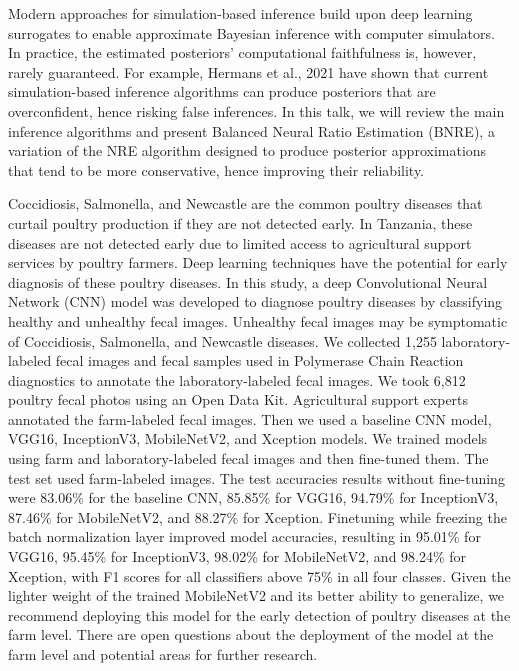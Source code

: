 \license

Modern approaches for simulation-based inference build upon deep learning surrogates to enable approximate Bayesian inference with computer simulators. In practice, the estimated posteriors' computational faithfulness is, however, rarely guaranteed. For example, Hermans et al., 2021 have shown that current simulation-based inference algorithms can produce posteriors that are overconfident, hence risking false inferences. In this talk, we will review the main inference algorithms and present Balanced Neural Ratio Estimation (BNRE), a variation of the NRE algorithm designed to produce posterior approximations that tend to be more conservative, hence improving their reliability.

\license

Coccidiosis, Salmonella, and Newcastle are the common poultry diseases that curtail poultry production if they are not detected early. In Tanzania, these diseases are not detected early due to limited access to agricultural support services by poultry farmers. Deep learning techniques have the potential for early diagnosis of these poultry diseases. In this study, a deep Convolutional Neural Network (CNN) model was developed to diagnose poultry diseases by classifying healthy and unhealthy fecal images. Unhealthy fecal images may be symptomatic of Coccidiosis, Salmonella, and Newcastle diseases. We collected 1,255 laboratory-labeled fecal images and fecal samples used in Polymerase Chain Reaction diagnostics to annotate the laboratory-labeled fecal images. We took 6,812 poultry fecal photos using an Open Data Kit. Agricultural support experts annotated the farm-labeled fecal images. Then we used a baseline CNN model, VGG16, InceptionV3, MobileNetV2, and Xception models. We trained models using farm and laboratory-labeled fecal images and then fine-tuned them. The test set used farm-labeled images. The test accuracies results without fine-tuning were 83.06\% for the baseline CNN, 85.85\% for VGG16, 94.79\% for InceptionV3, 87.46\% for MobileNetV2, and 88.27\% for Xception. Finetuning while freezing the batch normalization layer improved model accuracies, resulting in 95.01\% for VGG16, 95.45\% for InceptionV3, 98.02\% for MobileNetV2, and 98.24\% for Xception, with F1 scores for all classifiers above 75\% in all four classes. Given the lighter weight of the trained MobileNetV2 and its better ability to generalize, we recommend deploying this model for the early detection of poultry diseases at the farm level. There are open questions about the deployment of the model at the farm level and potential areas for further research.

